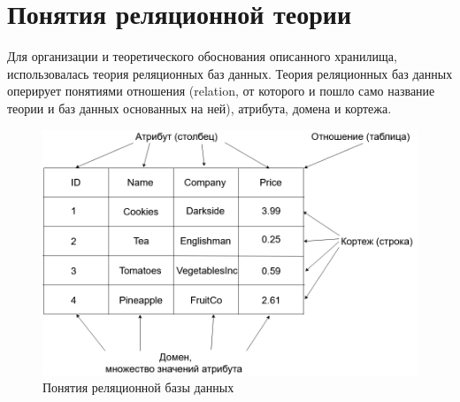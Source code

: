 \section{Понятия реляционной теории}
\indent Для организации и теоретического обоснования описанного хранилища, использовалась теория реляционных баз данных.
\indent Теория реляционных баз данных оперирует понятиями отношения (relation, от которого и пошло само название теории и баз данных основанных на ней), атрибута, домена и кортежа.

\begin{figure}[ht]
	\centering
	\includegraphics[width=\linewidth]{pics/databaseExample.png}
	\caption{Понятия реляционной базы данных}
	\label{fig:dbExample}
\end{figure}

